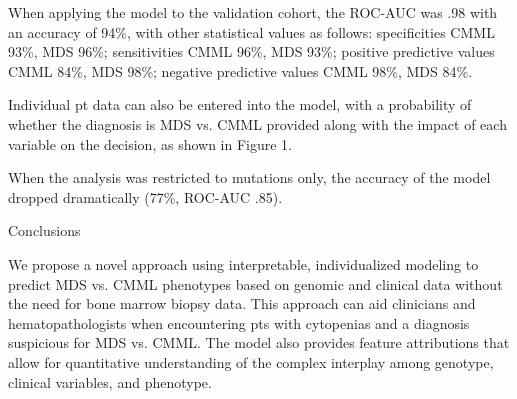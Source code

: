 When applying the model to the validation cohort, the ROC-AUC was .98 with an accuracy of 94\%, with other statistical values as follows: specificities CMML 93\%, MDS 96\%; sensitivities CMML 96\%, MDS 93\%; positive predictive values CMML 84\%, MDS 98\%; negative predictive values CMML 98\%, MDS 84\%.

Individual pt data can also be entered into the model, with a probability of whether the diagnosis is MDS vs. CMML provided along with the impact of each variable on the decision, as shown in Figure 1.

When the analysis was restricted to mutations only, the accuracy of the model dropped dramatically (77\%, ROC-AUC .85).


Conclusions

We propose a novel approach using interpretable, individualized modeling to predict MDS vs. CMML phenotypes based on genomic and clinical data without the need for bone marrow biopsy data. This approach can aid clinicians and hematopathologists when encountering pts with cytopenias and a diagnosis suspicious for MDS vs. CMML. The model also provides feature attributions that allow for quantitative understanding of the complex interplay among genotype, clinical variables, and phenotype.


